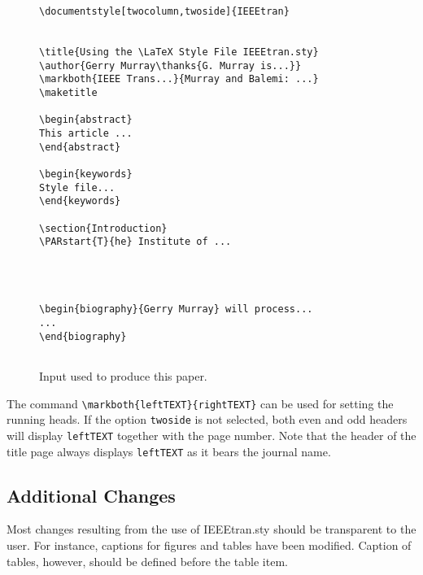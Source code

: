 \begin{figure}[htb]
\mbox{}\hrulefill
\vspace{-.3em}
\begin{verbatim}
\documentstyle[twocolumn,twoside]{IEEEtran}


\title{Using the \LaTeX Style File IEEEtran.sty}
\author{Gerry Murray\thanks{G. Murray is...}}
\markboth{IEEE Trans...}{Murray and Balemi: ...}
\maketitle

\begin{abstract}
This article ...
\end{abstract}

\begin{keywords}
Style file...
\end{keywords}

\section{Introduction}
\PARstart{T}{he} Institute of ...




\begin{biography}{Gerry Murray} will process...
...
\end{biography}


\end{verbatim}
\vspace{-.6em}
\mbox{}\hrulefill
\caption{Input used to produce this paper.}
\label{fig-example}
\end{figure}

The command \verb+\markboth{leftTEXT}{rightTEXT}+ can be used for
setting the running heads. If the option {\tt twoside} is not
selected, both even and odd headers will display {\tt leftTEXT}
together with the page number.  Note that the header of the title page
always displays {\tt leftTEXT} as it bears the journal name.

\subsection{Additional Changes}
Most changes resulting from the use of IEEEtran.sty should be
transparent to the user. For instance,
captions for figures and tables have been modified. Caption of
tables, however, should be defined before the table item.

